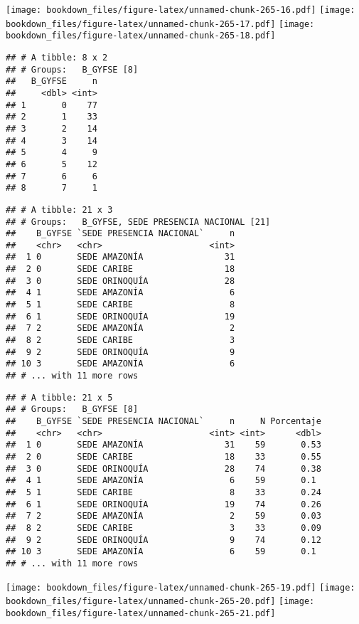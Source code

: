 \documentclass[]{article}
\theoremstyle{definition}
\theoremstyle{definition}
\theoremstyle{definition}
\theoremstyle{remark}
\begin{document}
\texttt{[image: bookdown\_files/figure-latex/unnamed-chunk-265-16.pdf]}
\texttt{[image: bookdown\_files/figure-latex/unnamed-chunk-265-17.pdf]}
\texttt{[image: bookdown\_files/figure-latex/unnamed-chunk-265-18.pdf]}

\begin{verbatim}
## # A tibble: 8 x 2
## # Groups:   B_GYFSE [8]
##   B_GYFSE     n
##     <dbl> <int>
## 1       0    77
## 2       1    33
## 3       2    14
## 4       3    14
## 5       4     9
## 6       5    12
## 7       6     6
## 8       7     1
\end{verbatim}

\begin{verbatim}
## # A tibble: 21 x 3
## # Groups:   B_GYFSE, SEDE PRESENCIA NACIONAL [21]
##    B_GYFSE `SEDE PRESENCIA NACIONAL`     n
##    <chr>   <chr>                     <int>
##  1 0       SEDE AMAZONÍA                31
##  2 0       SEDE CARIBE                  18
##  3 0       SEDE ORINOQUÍA               28
##  4 1       SEDE AMAZONÍA                 6
##  5 1       SEDE CARIBE                   8
##  6 1       SEDE ORINOQUÍA               19
##  7 2       SEDE AMAZONÍA                 2
##  8 2       SEDE CARIBE                   3
##  9 2       SEDE ORINOQUÍA                9
## 10 3       SEDE AMAZONÍA                 6
## # ... with 11 more rows
\end{verbatim}

\begin{verbatim}
## # A tibble: 21 x 5
## # Groups:   B_GYFSE [8]
##    B_GYFSE `SEDE PRESENCIA NACIONAL`     n     N Porcentaje
##    <chr>   <chr>                     <int> <int>      <dbl>
##  1 0       SEDE AMAZONÍA                31    59       0.53
##  2 0       SEDE CARIBE                  18    33       0.55
##  3 0       SEDE ORINOQUÍA               28    74       0.38
##  4 1       SEDE AMAZONÍA                 6    59       0.1 
##  5 1       SEDE CARIBE                   8    33       0.24
##  6 1       SEDE ORINOQUÍA               19    74       0.26
##  7 2       SEDE AMAZONÍA                 2    59       0.03
##  8 2       SEDE CARIBE                   3    33       0.09
##  9 2       SEDE ORINOQUÍA                9    74       0.12
## 10 3       SEDE AMAZONÍA                 6    59       0.1 
## # ... with 11 more rows
\end{verbatim}

\texttt{[image: bookdown\_files/figure-latex/unnamed-chunk-265-19.pdf]}
\texttt{[image: bookdown\_files/figure-latex/unnamed-chunk-265-20.pdf]}
\texttt{[image: bookdown\_files/figure-latex/unnamed-chunk-265-21.pdf]}
\end{document}
